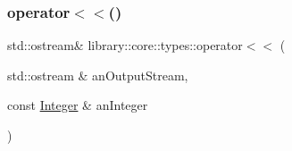 \mbox{\label{namespacelibrary_1_1core_1_1types_a8fcd2efaf239710c5a837397cdb69968}} 
\subsubsection{\texorpdfstring{operator$<$$<$()}{operator<<()}\hspace{0.1cm}{\footnotesize\ttfamily [2/2]}}
{\footnotesize\ttfamily std\+::ostream\& library\+::core\+::types\+::operator$<$$<$ (\begin{DoxyParamCaption}\item[{std\+::ostream \&}]{an\+Output\+Stream,  }\item[{const \mbox{\hyperlink{classlibrary_1_1core_1_1types_1_1_integer}{Integer}} \&}]{an\+Integer }\end{DoxyParamCaption})}

